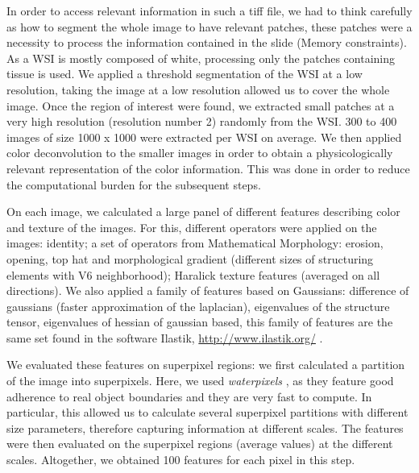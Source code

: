 \documentclass[a4paper,10pt]{article}
\begin{document}
In order to access relevant information in such a tiff file, we had to think carefully as how to segment the whole image to have relevant patches, these patches were a necessity to process the information contained in the slide (Memory constraints). As a WSI is mostly composed of white, processing only the patches containing tissue is used. We applied a threshold segmentation of the WSI at a low resolution, taking the image at a low resolution allowed us to cover the whole image. Once the region of interest were found, we extracted small patches at a very high resolution (resolution number 2) randomly from the WSI. 300 to 400 images of size 1000 x 1000 were extracted per WSI on average. We then applied color deconvolution \citep{deconvolution} to the smaller images in order to obtain a physicologically relevant representation
of the color information. This was done in order to reduce the
computational burden for the subsequent steps.

On each image, we calculated a large panel of different features describing color
and texture of the images. For this, different operators were applied
on the images: identity; a set of operators from Mathematical
Morphology: erosion, opening, top hat and morphological gradient (different
sizes of structuring elements with V6 neighborhood); Haralick texture
features (averaged on all directions). We also applied a family of features based
on Gaussians: difference of gaussians (faster approximation of the
laplacian), eigenvalues of the structure tensor, eigenvalues of
hessian of gaussian based, this family of features are the same set found in the software Ilastik, \url{http://www.ilastik.org/} \citep{Ilastik}.

We evaluated these features on superpixel regions: we first calculated
a partition of the image into superpixels. Here, we used
\textit{waterpixels} \citep{waterpixels}, as they feature good
adherence to real object boundaries and they are very fast to
compute.  In particular, this allowed us to calculate several
superpixel partitions with different size parameters, therefore capturing
information at different scales. The features were then evaluated on
the superpixel regions (average values) at the different
scales. Altogether, we obtained 100 features for each pixel in this step. 
\end{document}
